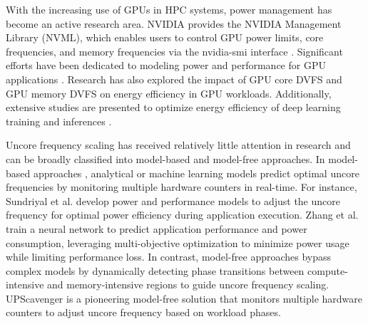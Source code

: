 With the increasing use of GPUs in HPC systems, power management has become an active research area. NVIDIA provides the NVIDIA Management Library (NVML), which enables users to control GPU power limits, core frequencies, and memory frequencies via the nvidia-smi interface \cite{NVML,nvidia-smi}. Significant efforts have been dedicated to modeling power and performance for GPU applications \cite{kandiah2021accelwattch,guerreiro2018gpgpu,arunkumar2019understanding,krzywaniak2020performance,guerreiro2019dvfs}. Research has also explored the impact of GPU core DVFS \cite{guerreiro2019dvfs,kraljic2022energy,fan2019predictable,ali2023performance} and GPU memory DVFS \cite{wang2020gpgpu} on energy efficiency in GPU workloads. 
Additionally, extensive studies are presented to optimize energy efficiency of deep learning training and inferences \cite{reguero2025energy,rajput2024benchmarking,panda2016conditional,8942147,you2023zeus}. 

Uncore frequency scaling has received relatively little attention in research and can be broadly classified into model-based and model-free approaches. In model-based approaches \cite{sundriyal2018core, zhang2024fcufs}, analytical or machine learning models predict optimal uncore frequencies by monitoring multiple hardware counters in real-time. For instance, Sundriyal et al. \cite{sundriyal2018core} develop power and performance models to adjust the uncore frequency for optimal power efficiency during application execution. Zhang et al. \cite{zhang2024fcufs} train a neural network to predict application performance and power consumption, leveraging multi-objective optimization to minimize power usage while limiting performance loss.
In contrast, model-free approaches \cite{gholkar2019uncore, guermouche2022combining} bypass complex models by dynamically detecting phase transitions between compute-intensive and memory-intensive regions to guide uncore frequency scaling. UPScavenger \cite{gholkar2019uncore} is a pioneering model-free solution that monitors multiple hardware counters to adjust uncore frequency based on workload phases.